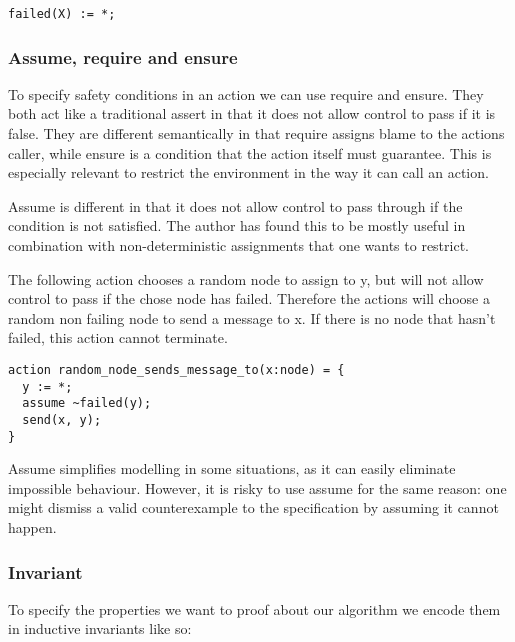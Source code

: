 \documentclass[fleqn]{article}
\begin{document}
\begin{mdframed}[backgroundcolor=light-gray, roundcorner=10pt,leftmargin=1, rightmargin=1, innerleftmargin=15, innertopmargin=15,innerbottommargin=15, outerlinewidth=1, linecolor=light-gray]
\begin{lstlisting}
failed(X) := *;
\end{lstlisting}
\end{mdframed}

\subsubsection{Assume, require and ensure}
To specify safety conditions in an action we can use require and ensure.
They both act like a traditional assert in that it does not allow control to pass if it is false.
They are different semantically in that require assigns blame to the actions caller, while ensure
is a condition that the action itself must guarantee. This is especially relevant to restrict
the environment in the way it can call an action.

Assume is different in that it does not allow control to pass through if the condition is not satisfied.
The author has found this to be mostly useful in combination with non-deterministic assignments that one
wants to restrict.

The following action chooses a random node to assign to y, but will not allow control to pass if
the chose node has failed. Therefore the actions will choose a random non failing node to send a message to x.
If there is no node that hasn't failed, this action cannot terminate.

\begin{mdframed}[backgroundcolor=light-gray, roundcorner=10pt,leftmargin=1, rightmargin=1, innerleftmargin=15, innertopmargin=15,innerbottommargin=15, outerlinewidth=1, linecolor=light-gray]
\begin{lstlisting}
action random_node_sends_message_to(x:node) = {
  y := *;
  assume ~failed(y);
  send(x, y);
}
\end{lstlisting}
\end{mdframed}

Assume simplifies modelling in some situations, as it can easily eliminate impossible behaviour. However,
it is risky to use assume for the same reason: one might dismiss a valid counterexample to the specification
by assuming it cannot happen.


\subsubsection{Invariant}
To specify the properties we want to proof about our algorithm we encode them in inductive invariants like so:
\end{document}
